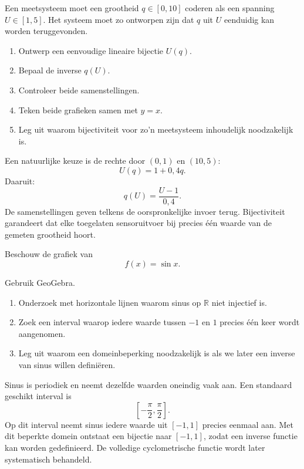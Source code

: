 \documentclass{ximera}
\begin{document}
\begin{oefening}{\oefG}

Een meetsysteem moet een grootheid \(q\in[0,10]\) coderen als een spanning
\(U\in[1,5]\). Het systeem moet zo ontworpen zijn dat \(q\) uit \(U\)
eenduidig kan worden teruggevonden.

\begin{enumerate}
    \item Ontwerp een eenvoudige lineaire bijectie \(U(q)\).
    \item Bepaal de inverse \(q(U)\).
    \item Controleer beide samenstellingen.
    \item Teken beide grafieken samen met \(y=x\).
    \item Leg uit waarom bijectiviteit voor zo'n meetsysteem inhoudelijk noodzakelijk is.
\end{enumerate}

\begin{oplossing}
Een natuurlijke keuze is de rechte door \((0,1)\) en \((10,5)\):
\[
U(q)=1+0{,}4q.
\]
Daaruit:
\[
q(U)=\frac{U-1}{0{,}4}.
\]
De samenstellingen geven telkens de oorspronkelijke invoer terug.
Bijectiviteit garandeert dat elke toegelaten sensoruitvoer bij precies één
waarde van de gemeten grootheid hoort.
\end{oplossing}

\end{oefening}

\begin{oefening}{\oefG}

Beschouw de grafiek van
\[
f(x)=\sin x.
\]

Gebruik GeoGebra.

\begin{enumerate}
    \item Onderzoek met horizontale lijnen waarom sinus op \(\mathbb R\)
          niet injectief is.
    \item Zoek een interval waarop iedere waarde tussen \(-1\) en \(1\)
          precies één keer wordt aangenomen.
    \item Leg uit waarom een domeinbeperking noodzakelijk is als we later
          een inverse van sinus willen definiëren.
\end{enumerate}

\begin{oplossing}
Sinus is periodiek en neemt dezelfde waarden oneindig vaak aan.
Een standaard geschikt interval is
\[
\left[-\frac{\pi}{2},\frac{\pi}{2}\right].
\]
Op dit interval neemt sinus iedere waarde uit \([-1,1]\) precies eenmaal aan.
Met dit beperkte domein ontstaat een bijectie naar \([-1,1]\), zodat een
inverse functie kan worden gedefinieerd. De volledige cyclometrische functie
wordt later systematisch behandeld.
\end{oplossing}

\end{oefening}
\end{document}
